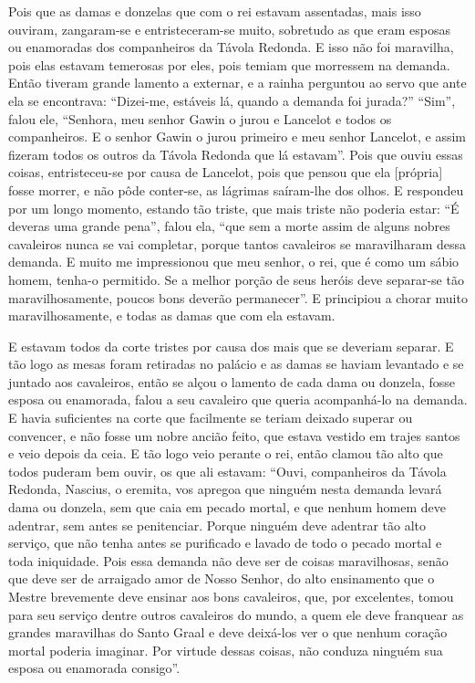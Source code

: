 Pois que as damas e donzelas que com o rei estavam assentadas, mais isso
ouviram, zangaram-se e entristeceram-se muito, sobretudo as que eram esposas ou
enamoradas dos companheiros da Távola Redonda. E isso não foi maravilha, pois
elas estavam temerosas por eles, pois temiam que morressem na demanda. Então
tiveram grande lamento a externar, e a rainha perguntou ao servo que ante ela
se encontrava: “Dizei-me, estáveis lá, quando a demanda foi jurada?” “Sim”,
falou ele, “Senhora, meu senhor Gawin o jurou e Lancelot e todos os
companheiros. E o senhor Gawin o jurou primeiro e meu senhor Lancelot, e assim
fizeram todos os outros da Távola Redonda que lá estavam”. Pois que ouviu essas
coisas, entristeceu-se por causa de Lancelot, pois que pensou que ela [própria] fosse
morrer, e não pôde conter-se, as lágrimas saíram-lhe dos olhos. E respondeu por um
longo momento, estando tão triste, que mais triste não poderia estar: “É
deveras uma grande pena”, falou ela, “que sem a morte assim de alguns nobres
cavaleiros nunca se vai completar, porque tantos cavaleiros se maravilharam
dessa demanda. E muito me impressionou que meu senhor, o rei, que é como um
sábio homem, tenha-o permitido. Se a melhor porção de seus heróis deve
separar-se tão maravilhosamente, poucos bons deverão permanecer”. E principiou
a chorar muito maravilhosamente, e todas as damas que com ela estavam. 

E estavam todos da corte tristes por causa dos mais que se deveriam separar. E
tão logo as mesas foram retiradas no palácio e as damas se haviam levantado e
se juntado aos cavaleiros, então se alçou o lamento de cada dama ou donzela,
fosse esposa ou enamorada, falou a seu cavaleiro que queria acompanhá-lo na
demanda. E havia suficientes na corte que facilmente se teriam deixado superar
ou convencer, e não fosse um nobre ancião feito, que estava vestido em trajes
santos e veio depois da ceia. E tão logo veio perante o rei, então clamou tão
alto que todos puderam bem ouvir, os que ali estavam: “Ouvi, companheiros da
Távola Redonda, Nascius, o eremita, vos apregoa que ninguém nesta demanda
levará dama ou donzela, sem que caia em pecado mortal, e que nenhum homem deve
adentrar, sem antes se penitenciar. Porque ninguém deve adentrar tão alto
serviço, que não tenha antes se purificado e lavado de todo o pecado mortal e
toda iniquidade. Pois essa demanda não deve ser de coisas maravilhosas, senão
que deve ser de arraigado amor de Nosso Senhor, do alto ensinamento que o
Mestre brevemente deve ensinar aos bons cavaleiros, que, por excelentes, tomou
para seu serviço dentre outros cavaleiros do mundo, a quem ele deve franquear
as grandes maravilhas do Santo Graal e deve deixá-los ver o que nenhum coração
mortal poderia imaginar. Por virtude dessas coisas, não conduza ninguém sua
esposa ou enamorada consigo”. 

